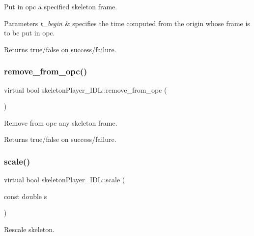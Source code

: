 Put in opc a specified skeleton frame. 


\begin{DoxyParams}{Parameters}
{\em t\+\_\+begin} & specifies the time computed from the origin whose frame is to be put in opc. \\
\hline
\end{DoxyParams}
\begin{DoxyReturn}{Returns}
true/false on success/failure. 
\end{DoxyReturn}
\mbox{\label{classskeletonPlayer__IDL_a5a8cedc7e51fc4129d1dadef1a7fec64}} 
\subsubsection{\texorpdfstring{remove\+\_\+from\+\_\+opc()}{remove\_from\_opc()}}
{\footnotesize\ttfamily virtual bool skeleton\+Player\+\_\+\+I\+D\+L\+::remove\+\_\+from\+\_\+opc (\begin{DoxyParamCaption}{ }\end{DoxyParamCaption})\hspace{0.3cm}{\ttfamily [virtual]}}



Remove from opc any skeleton frame. 

\begin{DoxyReturn}{Returns}
true/false on success/failure. 
\end{DoxyReturn}
\mbox{\label{classskeletonPlayer__IDL_ac70d533dc6ed1e642e0e03e639b6658c}} 
\subsubsection{\texorpdfstring{scale()}{scale()}}
{\footnotesize\ttfamily virtual bool skeleton\+Player\+\_\+\+I\+D\+L\+::scale (\begin{DoxyParamCaption}\item[{const double}]{s }\end{DoxyParamCaption})\hspace{0.3cm}{\ttfamily [virtual]}}



Rescale skeleton. 



